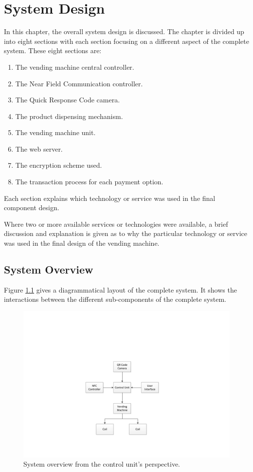 \chapter{System Design}
\label{chap:3}

In this chapter, the overall system design is discussed. The chapter is divided up into 
eight sections with each section focusing on a different aspect of the complete
system. These eight sections are:

\begin{enumerate}
  \item The vending machine central controller.
  \item The Near Field Communication controller.
  \item The Quick Response Code camera.
  \item The product dispensing mechanism.
  \item The vending machine unit.
  \item The web server.
  \item The encryption scheme used.
  \item The transaction process for each payment option. 
\end{enumerate}

Each section explains which technology or service was used in the final
component design.

Where two or more available services or technologies were available,
a brief discussion and explanation is given as to why the particular technology or
service was used in the final design of the vending machine.

\section{System Overview}

Figure \ref{fig:system-overview-pi} gives a diagrammatical layout of the complete system.
It shows the interactions between the different sub-components of the complete system.

\begin{figure}
\centering
\includegraphics[clip=true, trim = 100 80 0 150, scale=0.7]{pi_system_overview}
\caption{System overview from the control unit's perspective.}
\label{fig:system-overview-pi}
\end{figure}


